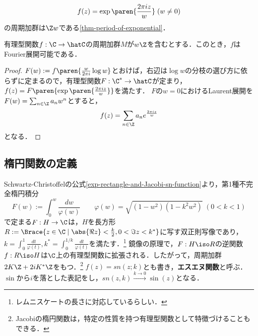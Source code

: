 \documentclass[uplatex, dvipdfmx]{jsreport}
\begin{document}
\begin{example}[指数関数の周期]
    \[f(z)=\exp\paren{\frac{2\pi iz}{w}}\;(w\ne 0)\]
    の周期加群は$\Z w$である\ref{thm-period-of-exponential}．
\end{example}

\begin{proposition}
    有理型関数$f:\C\to\hatC$の周期加群$M$が$w\Z$を含むとする．このとき，$f$はFourier展開可能である．
\end{proposition}
\begin{proof}
    $F(w):=f\paren{\frac{w}{2\pi i}\log w}$とおけば，右辺は$\log w$の分枝の選び方に依らずに定まるので，有理型関数$F:\C^*\to\hatC$が定まり，$f(z)=F\paren{\exp\paren{\frac{2\pi iz}{w}}}$を満たす．
    $F$の$w=0$におけるLaurent展開を$F(w)=\sum_{n\in\Z}a_nw^n$とすると，
    \[f(z)=\sum_{n\in\Z}a_ne^{\frac{2\pi iz}{w}}\]
    となる．
\end{proof}

\subsection{楕円関数の定義}

\begin{example}\label{exp-Jacobi-elliptic-function}
    Schwartz-Christoffelの公式\ref{exp-rectangle-and-Jacobi-sn-function}より，第1種不完全楕円積分
    \[F(w):=\int^w_0\frac{dw}{\varphi(w)}\qquad\varphi(w)=\sqrt{(1-w^2)(1-k^2w^2)}\;(0<k<1)\]
    で定まる$F:H\to\C$は，$H$を長方形$R:=\Brace{z\in\C\mid\abs{\Re z}<\frac{k}{2},0<\Im z<k^*}$に写す双正則写像であり，$k=\int^1_0\frac{dt}{\varphi(t)},k^*=\int^{1/k}_0\frac{dt}{\varphi(t)}$を満たす．\footnote{レムニスケートの長さに対応しているらしい．}
    鏡像の原理で，$F:H\iso R$の逆関数$f:R\iso H$は$\C$上の有理型関数に拡張される．したがって，周期加群$2K\Z+2iK^*\Z$をもつ．\footnote{Jacobiの楕円関数は，特定の性質を持つ有理型関数として特徴づけることもできる．}
    $f(z)=sn(z;k)$とも書き，\textbf{エスエヌ関数}と呼ぶ．$\sin$から$i$を落とした表記をし，$sn(z,k)\xrightarrow{k\to 0}\sin(z)$となる．
\end{example}
\end{document}
